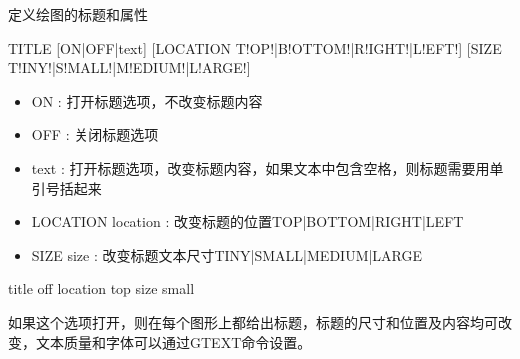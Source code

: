 \label{cmd:title}

定义绘图的标题和属性

\begin{SACSTX}
TITLE [ON|OFF|text] [LOCATION T!OP!|B!OTTOM!|R!IGHT!|L!EFT!] 
    [SIZE T!INY!|S!MALL!|M!EDIUM!|L!ARGE!]
\end{SACSTX}

\begin{itemize}
\item ON : 打开标题选项，不改变标题内容
\item OFF : 关闭标题选项 
\item text : 打开标题选项，改变标题内容，如果文本中包含空格，则标题需要用单引号括起来 
\item LOCATION location : 改变标题的位置TOP|BOTTOM|RIGHT|LEFT 
\item SIZE size : 改变标题文本尺寸TINY|SMALL|MEDIUM|LARGE 
\end{itemize}

\begin{SACDFT}
title off location top size small
\end{SACDFT}

如果这个选项打开，则在每个图形上都给出标题，标题的尺寸和位置及内容均可改变，文本质量和字体可以通过GTEXT命令设置。

